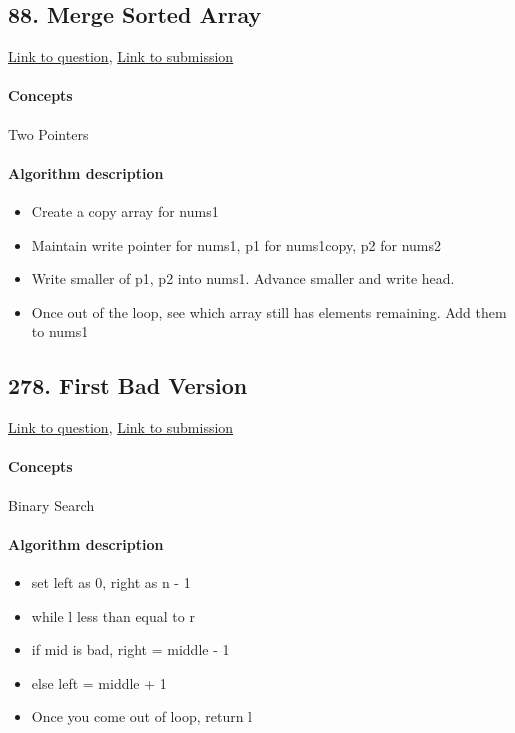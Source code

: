 \documentclass[11pt]{book}
\begin{document}
\subsection{88. Merge Sorted Array}
\href{https://leetcode.com/problems/merge-sorted-array/}{Link to question},
\href{https://leetcode.com/submissions/detail/335252401/}{Link to submission}
\paragraph{Concepts}
Two Pointers
\paragraph{Algorithm description}
\begin{itemize}
    \item Create a copy array for nums1
    \item Maintain write pointer for nums1, p1 for nums1copy, p2 for nums2
    \item Write smaller of p1, p2 into nums1. Advance smaller and write head.
    \item Once out of the loop, see which array still has elements remaining. Add them to nums1
\end{itemize}

\subsection{278. First Bad Version}
\href{https://leetcode.com/problems/first-bad-version/}{Link to question},
\href{https://leetcode.com/submissions/detail/335254058/}{Link to submission}
\paragraph{Concepts}
Binary Search
\paragraph{Algorithm description}
\begin{itemize}
    \item set left as 0, right as n - 1
    \item while l less than equal to r
    \item if mid is bad, right = middle - 1
    \item else left = middle + 1
    \item Once you come out of loop, return l
\end{itemize}
\end{document}
